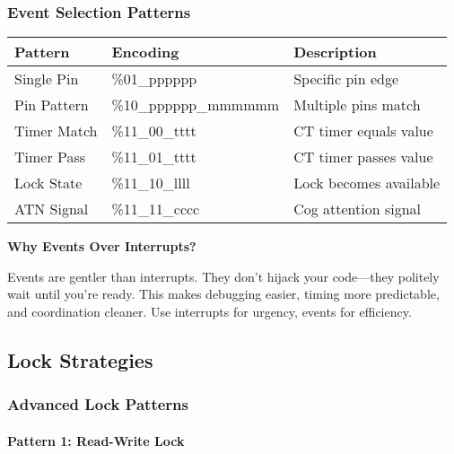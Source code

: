 \documentclass[11pt]{book}
\begin{document}
\hypertarget{event-selection-patterns}{%
\subsubsection{Event Selection
Patterns}\label{event-selection-patterns}}

\begin{longtable}[]{@{}lll@{}}
\toprule
Pattern & Encoding & Description \\
\midrule
\endhead
Single Pin & \%01\_pppppp & Specific pin edge \\
Pin Pattern & \%10\_pppppp\_mmmmmm & Multiple pins match \\
Timer Match & \%11\_00\_tttt & CT timer equals value \\
Timer Pass & \%11\_01\_tttt & CT timer passes value \\
Lock State & \%11\_10\_llll & Lock becomes available \\
ATN Signal & \%11\_11\_cccc & Cog attention signal \\
\bottomrule
\end{longtable}

\begin{sidetrack}
\textbf{Why Events Over Interrupts?}

Events are gentler than interrupts. They don't hijack your code—they politely wait until you're ready. This makes debugging easier, timing more predictable, and coordination cleaner. Use interrupts for urgency, events for efficiency.
\end{sidetrack}

\hypertarget{lock-strategies}{%
\subsection{Lock Strategies}\label{lock-strategies}}

\hypertarget{advanced-lock-patterns}{%
\subsubsection{Advanced Lock Patterns}\label{advanced-lock-patterns}}

\hypertarget{pattern-1-read-write-lock}{%
\paragraph{Pattern 1: Read-Write Lock}\label{pattern-1-read-write-lock}}
\end{document}
